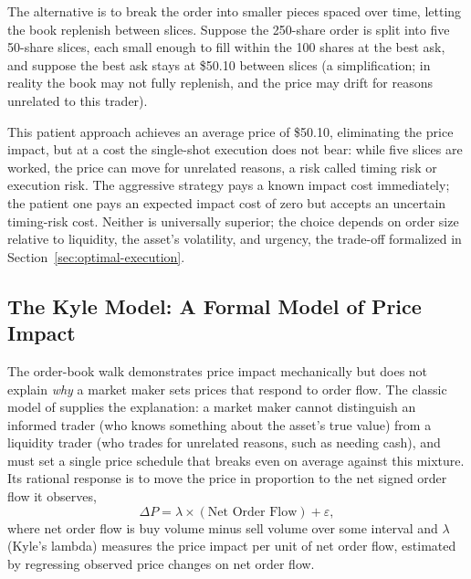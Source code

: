 \documentclass[../ai_in_finance]{subfiles}
\begin{document}
The alternative is to break the order into smaller pieces spaced over time, letting the book replenish between slices. Suppose the 250-share order is split into five 50-share slices, each small enough to fill within the 100 shares at the best ask, and suppose the best ask stays at \$50.10 between slices (a simplification; in reality the book may not fully replenish, and the price may drift for reasons unrelated to this trader).

This patient approach achieves an average price of \$50.10, eliminating the price impact, but at a cost the single-shot execution does not bear: while five slices are worked, the price can move for unrelated reasons, a risk called timing risk or execution risk. The aggressive strategy pays a known impact cost immediately; the patient one pays an expected impact cost of zero but accepts an uncertain timing-risk cost. Neither is universally superior; the choice depends on order size relative to liquidity, the asset's volatility, and urgency, the trade-off formalized in Section~\ref{sec:optimal-execution}.

\subsection{The Kyle Model: A Formal Model of Price Impact}
\label{sec:kyle-model}

The order-book walk demonstrates price impact mechanically but does not explain \emph{why} a market maker sets prices that respond to order flow. The classic model of \textcite{kyle1985continuous} supplies the explanation: a market maker cannot distinguish an informed trader (who knows something about the asset's true value) from a liquidity trader (who trades for unrelated reasons, such as needing cash), and must set a single price schedule that breaks even on average against this mixture. Its rational response is to move the price in proportion to the net signed order flow it observes,
\begin{equation}
\Delta P = \lambda \times (\text{Net Order Flow}) + \varepsilon,
\label{eq:algotrading-kyle}
\end{equation}
where net order flow is buy volume minus sell volume over some interval and $\lambda$ (Kyle's lambda) measures the price impact per unit of net order flow, estimated by regressing observed price changes on net order flow.
\end{document}
